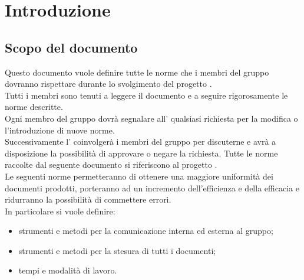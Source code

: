 %


\section{Introduzione}


	\subsection{Scopo del documento}
Questo documento vuole definire tutte le norme che i membri del gruppo \groupName{} dovranno rispettare durante lo svolgimento del progetto \projectName.\\
Tutti i membri sono tenuti a leggere il documento e a seguire rigorosamente le norme descritte.\\
Ogni membro del gruppo dovrà segnalare all'\roleAdministrator{} qualsiasi richiesta per la modifica o l'introduzione di nuove norme.\\
Successivamente l'\roleAdministrator{} coinvolgerà i membri del gruppo per discuterne e avrà a disposizione la possibilità di approvare o negare la richiesta.
Tutte le norme raccolte dal seguente documento si riferiscono al progetto \projectName.\\
Le seguenti norme permetteranno di ottenere una maggiore uniformità dei documenti prodotti, porteranno ad un incremento dell'efficienza e della efficacia e ridurranno la possibilità di commettere errori.\\
In particolare si vuole definire:
\begin{itemize}
\item strumenti e metodi per la comunicazione interna ed esterna al gruppo;
\item strumenti e metodi per la stesura di tutti i documenti;
\item tempi e modalità di lavoro.
\end{itemize}






